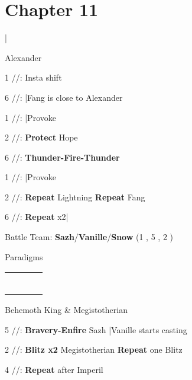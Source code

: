 \section{Chapter 11}

\begin{mainlist}
	\item {}|
\end{mainlist}
\begin{fight}{Alexander}
	\item [1] \rav/\med/\sen: Insta shift
	\item [6] \rav/\rav/\com: |Fang is close to Alexander
	\item [1] \rav/\med/\sen: |Provoke
	\item [2] \syn/\med/\sen: \textbf{Protect} Hope
	\item [6] \rav/\rav/\com: \textbf{Thunder-Fire-Thunder}
	\item [1] \rav/\med/\sen: |Provoke
	\item [2] \syn/\med/\sen: \textbf{Repeat} Lightning \to \textbf{Repeat} Fang
	\item [6] \rav/\rav/\com: \textbf{Repeat} x2|
\end{fight}
\begin{menu}
	\item Battle Team: \textbf{Sazh}/\textbf{Vanille}/\textbf{Snow} (1 , 5 , 2 )
	\item Paradigms
	\begin{tabular}{cccl}
		\com          & \med          & \chrole{\com} &          \\
		\com          & \chrole{\sab} & \rav          &          \\
		\syn          & \med          & \chrole{\com} &          \\
		\mkrole{\com} & \chrole{\sab} & \com          &          \\
		\syn          & \mkrole{\sab} & \com          &  \\
		\mkrole{\com} & \rav          & \com          &
	\end{tabular}
\end{menu}
\begin{fight}{Behemoth King \& Megistotherian}
	\item [5] \syn/\sab/\com: \textbf{Bravery-Enfire} Sazh |Vanille starts casting
	\item [2] \com/\sab/\rav: \textbf{Blitz x2} Megistotherian \to \textbf{Repeat} one Blitz
	\item [4] \com/\sab/\com: \textbf{Repeat} after Imperil
\end{fight}
